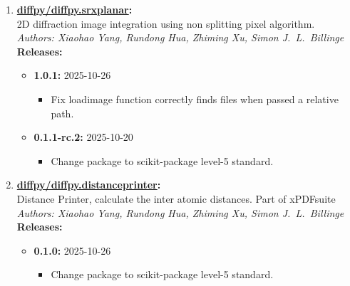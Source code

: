 \documentclass[prl,tighten,amsmath,amssymb,floatfix]{revtex4-1}
\begin{document}
\begin{enumerate}
  \item \textbf{\href{https://github.com/diffpy/diffpy.srxplanar}{diffpy/diffpy.srxplanar}:}\\
  \hspace*{1em}2D diffraction image integration using non splitting pixel algorithm.\\
  \hspace*{1em}\textit{Authors: Xiaohao Yang, Rundong Hua, Zhiming Xu, Simon J.~L.~Billinge}\\
  \hspace*{1em}\textbf{Releases:}\vspace{-0.5em}
  \begin{itemize}[label={}]
      \item \textbf{1.0.1:} 2025-10-26
      \begin{itemize}[label={}, leftmargin=2em]
        \item Fix loadimage function correctly finds files when passed a relative path.
      \end{itemize}
      \item \textbf{0.1.1-rc.2:} 2025-10-20
      \begin{itemize}[label={}, leftmargin=2em]
        \item Change package to scikit-package level-5 standard.
      \end{itemize}
  \end{itemize}

  \item \textbf{\href{https://github.com/diffpy/diffpy.distanceprinter}{diffpy/diffpy.distanceprinter}:}\\
  \hspace*{1em}Distance Printer, calculate the inter atomic distances. Part of xPDFsuite\\
  \hspace*{1em}\textit{Authors: Xiaohao Yang, Rundong Hua, Zhiming Xu, Simon J.~L.~Billinge}\\
  \hspace*{1em}\textbf{Releases:}\vspace{-0.5em}
  \begin{itemize}[label={}]
    \item \textbf{0.1.0:} 2025-10-26
      \begin{itemize}[label={}, leftmargin=2em]
        \item Change package to scikit-package level-5 standard.
      \end{itemize}
  \end{itemize}

\end{enumerate}
\end{document}
